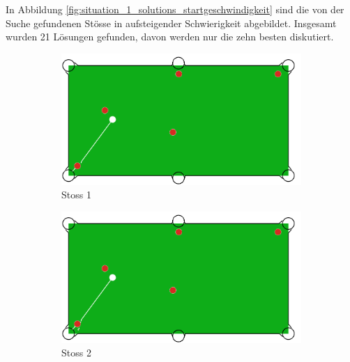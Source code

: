 In Abbildung \ref{fig:situation_1_solutions_startgeschwindigkeit} sind die von der Suche gefundenen Stösse in aufsteigender Schwierigkeit abgebildet.
Insgesamt wurden 21 Lösungen gefunden, davon werden nur die zehn besten diskutiert.

\begin{figure}[h!]
    \centering
    \begin{subfigure}[b]{0.3\textwidth}
        \centering
        \includegraphics[width=1.0\linewidth]{../common/04_results/resources/simple_search/situation_diverse_solution_velocity_1.PNG}
        \caption{Stoss 1}
        \label{fig:situation_velocity_1_solution_1}
    \end{subfigure}
    \hfill
    \begin{subfigure}[b]{0.3\textwidth}
        \centering
        \includegraphics[width=1.0\linewidth]{../common/04_results/resources/simple_search/situation_diverse_solution_velocity_2.PNG}
        \caption{Stoss 2}
        \label{fig:situation_velocity_1_solution_2}
    \end{subfigure}
    \hfill
    \begin{subfigure}[b]{0.3\textwidth}
        \centering

\end{subfigure}
\end{figure}
